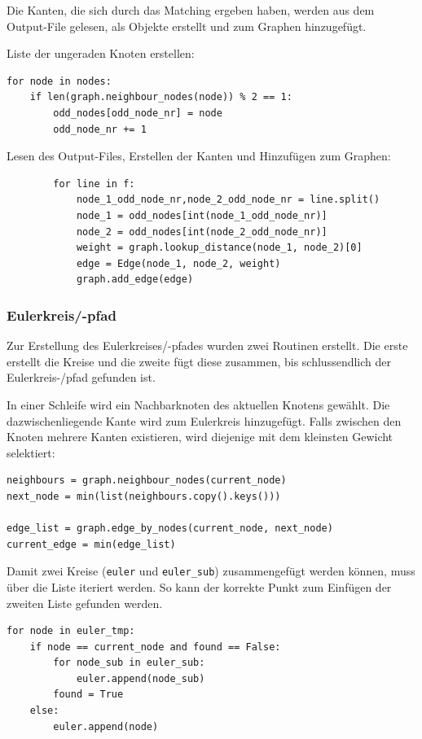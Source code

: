 \documentclass[11pt,a4paper]{article}
\begin{document}
Die Kanten, die sich durch das Matching ergeben haben, werden aus dem Output-File gelesen, als Objekte erstellt und zum Graphen hinzugefügt.

\begin{flushleft}
    Liste der ungeraden Knoten erstellen:
\end{flushleft}
\begin{verbatim}
for node in nodes:
    if len(graph.neighbour_nodes(node)) % 2 == 1:
        odd_nodes[odd_node_nr] = node
        odd_node_nr += 1
\end{verbatim}

\begin{flushleft}
    Lesen des Output-Files, Erstellen der Kanten und Hinzufügen zum Graphen:
\end{flushleft}
\begin{verbatim}
        for line in f:
            node_1_odd_node_nr,node_2_odd_node_nr = line.split()
            node_1 = odd_nodes[int(node_1_odd_node_nr)] 
            node_2 = odd_nodes[int(node_2_odd_node_nr)]
            weight = graph.lookup_distance(node_1, node_2)[0]
            edge = Edge(node_1, node_2, weight)
            graph.add_edge(edge)
\end{verbatim}

\subsubsection{Eulerkreis/-pfad}
Zur Erstellung des Eulerkreises/-pfades wurden zwei Routinen erstellt. Die erste erstellt die Kreise und die zweite fügt diese zusammen, bis schlussendlich der Eulerkreis-/pfad gefunden ist.

\begin{flushleft}
    In einer Schleife wird ein Nachbarknoten des aktuellen Knotens gewählt. Die dazwischenliegende Kante wird zum Eulerkreis hinzugefügt. Falls zwischen den Knoten mehrere Kanten existieren, wird diejenige mit dem kleinsten Gewicht selektiert:
\end{flushleft}
\begin{verbatim}
neighbours = graph.neighbour_nodes(current_node)
next_node = min(list(neighbours.copy().keys()))

edge_list = graph.edge_by_nodes(current_node, next_node)
current_edge = min(edge_list)
\end{verbatim}

\begin{flushleft}
    Damit zwei Kreise (\texttt{euler} und \texttt{euler\_sub}) zusammengefügt werden können, muss über die Liste iteriert werden. So kann der korrekte Punkt zum Einfügen der zweiten Liste gefunden werden.
\end{flushleft}
\begin{verbatim}
for node in euler_tmp:
    if node == current_node and found == False:
        for node_sub in euler_sub:
            euler.append(node_sub)
        found = True
    else:
        euler.append(node)
\end{verbatim}
\end{document}
